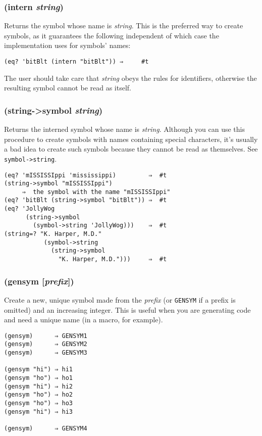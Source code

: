 \documentclass{article}
\begin{document}
\subsubsection{(intern \emph{string})}

Returns the symbol whose name is \emph{string}. This is the preferred way to create symbols,
as it guarantees the following independent of which case the implementation uses for symbols'
names:

\begin{verbatim}
(eq? 'bitBlt (intern "bitBlt")) ⇒     #t
\end{verbatim}

The user should take care that \emph{string} obeys the rules for identifiers, otherwise the
resulting symbol cannot be read as itself.

\subsubsection{(string-\textgreater{}symbol \emph{string})}

Returns the interned symbol whose name is \emph{string}. Although you can use this procedure
to create symbols with names containing special characters, it's usually a bad idea to create
such symbols because they cannot be read as themselves. See
\verb|symbol->string|.

\begin{verbatim}
(eq? 'mISSISSIppi 'mississippi)         ⇒  #t
(string->symbol "mISSISSIppi")
     ⇒  the symbol with the name "mISSISSIppi"
(eq? 'bitBlt (string->symbol "bitBlt")) ⇒  #t
(eq? 'JollyWog
      (string->symbol
        (symbol->string 'JollyWog)))    ⇒  #t
(string=? "K. Harper, M.D."
           (symbol->string
             (string->symbol
               "K. Harper, M.D.")))     ⇒  #t
\end{verbatim}

\subsubsection{(gensym [\emph{prefix}])}

Create a new, unique symbol made from the \emph{prefix} (or \verb|GENSYM| if a prefix is
omitted) and an increasing integer. This is useful when you are generating code and need a
unique name (in a macro, for example).

\begin{verbatim}
(gensym)      ⇒ GENSYM1
(gensym)      ⇒ GENSYM2
(gensym)      ⇒ GENSYM3

(gensym "hi") ⇒ hi1
(gensym "ho") ⇒ ho1
(gensym "hi") ⇒ hi2
(gensym "ho") ⇒ ho2
(gensym "ho") ⇒ ho3
(gensym "hi") ⇒ hi3

(gensym)      ⇒ GENSYM4
\end{verbatim}
\end{document}
